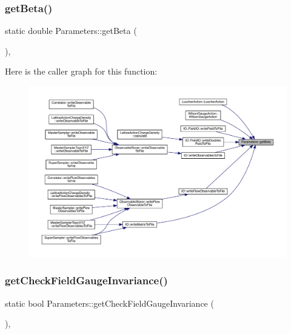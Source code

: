 \subsubsection{\texorpdfstring{getBeta()}{getBeta()}}
{\footnotesize\ttfamily static double Parameters\+::get\+Beta (\begin{DoxyParamCaption}{ }\end{DoxyParamCaption})\hspace{0.3cm}{\ttfamily [inline]}, {\ttfamily [static]}}

Here is the caller graph for this function\+:\nopagebreak
\begin{figure}[H]
\begin{center}
\leavevmode
\includegraphics[width=350pt]{class_parameters_ae5c64523dc50dca13b417fe3d9e4175c_icgraph}
\end{center}
\end{figure}
\mbox{\label{class_parameters_a2563b9474acd87cf4a350f488c71339f}} 
\subsubsection{\texorpdfstring{getCheckFieldGaugeInvariance()}{getCheckFieldGaugeInvariance()}}
{\footnotesize\ttfamily static bool Parameters\+::get\+Check\+Field\+Gauge\+Invariance (\begin{DoxyParamCaption}{ }\end{DoxyParamCaption})\hspace{0.3cm}{\ttfamily [inline]}, {\ttfamily [static]}}

